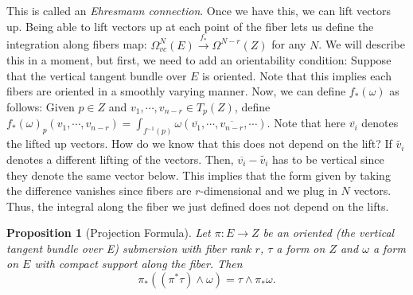 \documentclass[12pt]{amsart}
\newtheorem{proposition}{Proposition}
\theoremstyle{remark}
\begin{document}
This is called an \textit{Ehresmann connection}. Once we have this, we can lift vectors up. Being able to lift vectors up at each point of the fiber lets us define the integration along fibers map: $\Omega^N_{vc}(E)\xrightarrow{f_*} \Omega^{N-r}(Z)$ for any $N$. We will describe this in a moment, but first, we need to add an orientability condition: Suppose that the vertical tangent bundle over $E$ is oriented. Note that this implies each fibers are oriented in a smoothly varying manner. Now, we can define $f_*(\omega)$ as follows: Given $p\in Z$ and $v_1,\cdots,v_{n-r}\in T_p(Z)$, define $f_*(\omega)_p(v_1,\cdots,v_{n-r})=\int_{f^{-1}(p)} \omega(\overline{v_1},\cdots,\overline{v_{n-r}},\cdots)$. Note that here $\overline{v_i}$ denotes the lifted up vectors. How do we know that this does not depend on the lift? If $\tilde{v_i}$ denotes a different lifting of the vectors. Then, $\overline{v_i}-\tilde{v_i}$ has to be vertical since they denote the same vector below. This implies that the form given by taking the difference vanishes since fibers are $r$-dimensional and we plug in $N$ vectors. Thus, the integral along the fiber we just defined does not depend on the lifts. 
\begin{proposition}[Projection Formula]
Let $\pi:E\to Z$ be an oriented (the vertical tangent bundle over E) submersion with fiber rank $r$, $\tau$ a form on $Z$ and $\omega$ a form on $E$ with compact support along the fiber. Then 
$$\pi_*((\pi^*\tau)\wedge \omega)=\tau\wedge \pi_*\omega.$$
\end{proposition}
\end{document}
